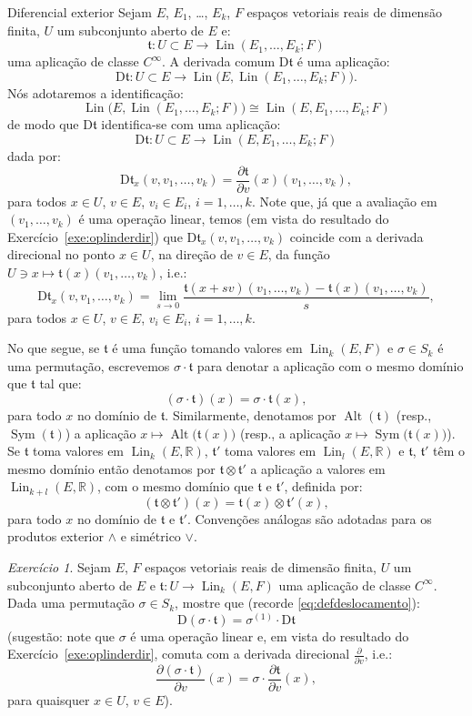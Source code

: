 \documentclass[oneside,11pt]{amsart}
\newcommand{\R}{\mathds R}
\newcommand{\Dd}{\mathrm D}
\DeclareMathOperator{\Lin}{Lin}
\DeclareMathOperator{\Sym}{Sym}
\DeclareMathOperator{\Alt}{Alt}
\theoremstyle{remark}\newtheorem{exercise}{Exercício}[section]
\theoremstyle{plain}\newtheorem{teo}{Teorema}[section]
\theoremstyle{plain}\newtheorem{lem}[teo]{Lema}
\theoremstyle{plain}\newtheorem{prop}[teo]{Proposição}
\theoremstyle{definition}\newtheorem{defin}[teo]{Definição}
\theoremstyle{remark}\newtheorem{rem}[teo]{Observação}
\theoremstyle{definition}\newtheorem{example}[teo]{Exemplo}
\numberwithin{equation}{section}
\begin{document}
\begin{section}{Diferencial exterior}
Sejam $E$, $E_1$, \dots, $E_k$, $F$ espaços vetoriais reais de dimensão finita, $U$ um subconjunto aberto de $E$ e:
\[\mathfrak t:U\subset E\longrightarrow\Lin(E_1,\ldots,E_k;F)\]
uma aplicação de classe $C^\infty$. A derivada comum $\Dd\mathfrak t$ é uma aplicação:
\[\Dd\mathfrak t:U\subset E\longrightarrow\Lin\!\big(E,\Lin(E_1,\ldots,E_k;F)\big).\]
Nós adotaremos a identificação:
\[\Lin\!\big(E,\Lin(E_1,\ldots,E_k;F)\big)\cong\Lin(E,E_1,\ldots,E_k;F)\]
de modo que $\Dd\mathfrak t$ identifica-se com uma aplicação:
\[\Dd\mathfrak t:U\subset E\longrightarrow\Lin(E,E_1,\ldots,E_k;F)\]
dada por:
\[\Dd\mathfrak t_x(v,v_1,\ldots,v_k)=\frac{\partial\mathfrak t}{\partial v}(x)(v_1,\ldots,v_k),\]
para todos $x\in U$, $v\in E$, $v_i\in E_i$, $i=1,\ldots,k$. Note que, já que a avaliação em $(v_1,\ldots,v_k)$ é uma operação linear, temos
(em vista do resultado do Exercício~\ref{exe:oplinderdir}) que $\Dd\mathfrak t_x(v,v_1,\ldots,v_k)$ coincide com a derivada direcional no ponto $x\in U$,
na direção de $v\in E$, da função $U\ni x\mapsto\mathfrak t(x)(v_1,\ldots,v_k)$, i.e.:
\[\Dd\mathfrak t_x(v,v_1,\ldots,v_k)=\lim_{s\to0}\frac{\mathfrak t(x+sv)(v_1,\ldots,v_k)-\mathfrak t(x)(v_1,\ldots,v_k)}s,\]
para todos $x\in U$, $v\in E$, $v_i\in E_i$, $i=1,\ldots,k$.

\medskip

No que segue, se $\mathfrak t$ é uma função tomando valores em $\Lin_k(E,F)$ e $\sigma\in S_k$ é uma permutação, escrevemos $\sigma\cdot\mathfrak t$
para denotar a aplicação com o mesmo domínio que $\mathfrak t$ tal que:
\[(\sigma\cdot\mathfrak t)(x)=\sigma\cdot\mathfrak t(x),\]
para todo $x$ no domínio
de $\mathfrak t$. Similarmente, denotamos por $\Alt(\mathfrak t)$ (resp., $\Sym(\mathfrak t)$) a aplicação $x\mapsto\Alt\!\big(\mathfrak t(x)\big)$
(resp., a aplicação $x\mapsto\Sym\!\big(\mathfrak t(x)\big)$).
Se $\mathfrak t$ toma valores em $\Lin_k(E,\R)$, $\mathfrak t'$ toma valores em $\Lin_l(E,\R)$ e $\mathfrak t$, $\mathfrak t'$
têm o mesmo domínio então denotamos por $\mathfrak t\otimes\mathfrak t'$ a aplicação a valores em $\Lin_{k+l}(E,\R)$, com o mesmo domínio que $\mathfrak t$
e $\mathfrak t'$, definida por:
\[(\mathfrak t\otimes\mathfrak t')(x)=\mathfrak t(x)\otimes\mathfrak t'(x),\]
para todo $x$ no domínio de $\mathfrak t$ e
$\mathfrak t'$. Convenções análogas são adotadas para os produtos exterior $\wedge$ e simétrico $\vee$.

\begin{exercise}\label{exe:sigmaDd}
Sejam $E$, $F$ espaços vetoriais reais de dimensão finita, $U$ um subconjunto aberto de $E$ e $\mathfrak t:U\to\Lin_k(E,F)$ uma aplicação de classe $C^\infty$.
Dada uma permutação $\sigma\in S_k$, mostre que (recorde \eqref{eq:defdeslocamento}):
\[\Dd(\sigma\cdot\mathfrak t)=\sigma^{(1)}\cdot\Dd\mathfrak t\]
(sugestão: note que $\sigma$ é uma operação linear e, em vista do resultado do Exercício~\ref{exe:oplinderdir},
comuta com a derivada direcional $\frac{\partial}{\partial v}$, i.e.:
\[\frac{\partial(\sigma\cdot\mathfrak t)}{\partial v}(x)=\sigma\cdot\frac{\partial\mathfrak t}{\partial v}(x),\]
para quaisquer $x\in U$, $v\in E$).
\end{exercise}


\end{section}
\end{document}
